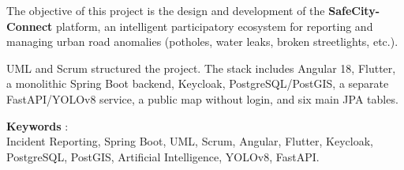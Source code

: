 The objective of this project is the design and development of the \textbf{SafeCity-Connect} platform, an intelligent participatory ecosystem for reporting and managing urban road anomalies (potholes, water leaks, broken streetlights, etc.).

UML and Scrum structured the project. The stack includes Angular 18, Flutter, a monolithic Spring Boot backend, Keycloak, PostgreSQL/PostGIS, a separate FastAPI/YOLOv8 service, a public map without login, and six main JPA tables.

\vspace{0.2cm}
\noindent \textbf{Keywords} : \\
Incident Reporting, Spring Boot, UML, Scrum, Angular, Flutter, Keycloak, PostgreSQL, PostGIS, Artificial Intelligence, YOLOv8, FastAPI.
